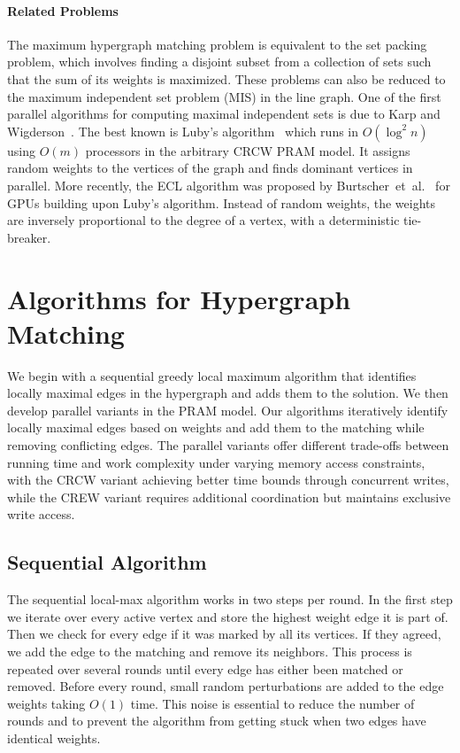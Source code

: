 \documentclass[runningheads]{llncs}
\begin{document}
\paragraph{Related Problems} The maximum hypergraph matching problem is equivalent to the set packing problem, which involves finding a disjoint subset from a collection of sets such that the sum of its weights is maximized. These problems can also be reduced to the maximum independent set problem (MIS) in the line graph.
One of the first parallel algorithms for computing maximal independent sets is due to Karp and Wigderson~\cite{10.1145/800057.808690}.
The best known is Luby's algorithm~\cite{luby1985simple} which runs in $O(\log^2{n})$ using $O(m)$ processors in the arbitrary CRCW PRAM model.
 It assigns random weights to the vertices of the graph and finds dominant vertices in parallel.
More recently, the ECL algorithm was proposed by Burtscher~et~al.~\cite{burtscher2018high} for GPUs building upon Luby's algorithm.
Instead of random weights, the weights are inversely proportional to the degree of a vertex, with a deterministic tie-breaker.

\section{Algorithms for Hypergraph Matching}\label{sec:algos:hm}
We begin with a sequential greedy local maximum algorithm that identifies locally maximal edges in the hypergraph and adds them to the solution. We then develop parallel variants in the PRAM model. Our algorithms iteratively identify locally maximal edges based on weights and add them to the matching while removing conflicting edges. The parallel variants offer different trade-offs between running time and work complexity under varying memory access constraints, with the CRCW variant achieving better time bounds through concurrent writes, while the CREW variant requires additional coordination but maintains exclusive write access.

\subsection{Sequential Algorithm}\label{sequ:description}
The sequential local-max algorithm works in two steps per round. In the first step we iterate over every active vertex and store the highest weight edge it is part of. Then we check for every edge if it was marked by all its vertices.
If they agreed, we add the edge to the matching and remove its neighbors.
This process is repeated over several rounds until every edge has either been matched or removed.
Before every round, small random perturbations are added to the edge weights taking $O(1)$ time. This noise is essential to reduce the number of rounds and to prevent the algorithm from getting stuck when two edges have identical weights.
\end{document}
